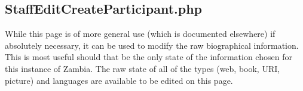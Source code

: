 \documentclass[captions=tablesignature]{scrartcl}
\begin{document}
\subsection{StaffEditCreateParticipant.php}
\label{sec-3-3}
\label{StaffEditCreateParticipant.php}
While this page is of more general use (which is documented
elsewhere) if absolutely necessary, it can be used to modify the
raw biographical information. This is most useful should that be
the only state of the information chosen for this instance of
Zambia.  The raw state of all of the types (web, book, URI,
picture) and languages are available to be edited on this page.
\end{document}
